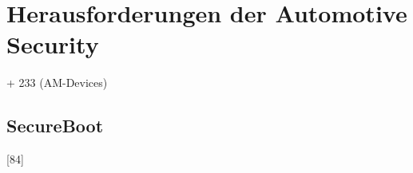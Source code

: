 %



\section{Herausforderungen der Automotive Security}
\cite[36]{Wurm.2022} + 233 (AM-Devices)

\subsection{SecureBoot}
\cite{Wurm.2022}[84]